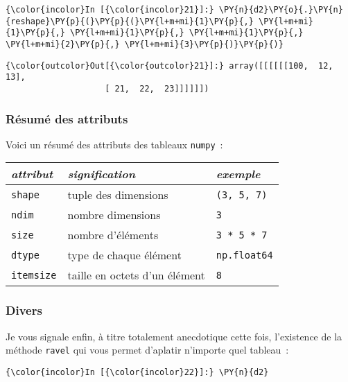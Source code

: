     \begin{Verbatim}[commandchars=\\\{\},frame=single,framerule=0.3mm,rulecolor=\color{cellframecolor}]
{\color{incolor}In [{\color{incolor}21}]:} \PY{n}{d2}\PY{o}{.}\PY{n}{reshape}\PY{p}{(}\PY{p}{(}\PY{l+m+mi}{1}\PY{p}{,} \PY{l+m+mi}{1}\PY{p}{,} \PY{l+m+mi}{1}\PY{p}{,} \PY{l+m+mi}{1}\PY{p}{,} \PY{l+m+mi}{2}\PY{p}{,} \PY{l+m+mi}{3}\PY{p}{)}\PY{p}{)}
\end{Verbatim}


\begin{Verbatim}[commandchars=\\\{\},frame=single,framerule=0.3mm,rulecolor=\color{cellframecolor}]
{\color{outcolor}Out[{\color{outcolor}21}]:} array([[[[[[100,  12,  13],
                    [ 21,  22,  23]]]]]])
\end{Verbatim}
            
    \hypertarget{ruxe9sumuxe9-des-attributs}{%
\subsubsection{Résumé des attributs}\label{ruxe9sumuxe9-des-attributs}}

    Voici un résumé des attributs des tableaux \texttt{numpy}~:

    \begin{longtable}[]{@{}lll@{}}
\toprule
\emph{attribut} & \emph{signification} & \emph{exemple}\tabularnewline
\midrule
\endhead
\texttt{shape} & tuple des dimensions &
\texttt{(3,\ 5,\ 7)}\tabularnewline
\texttt{ndim} & nombre dimensions & \texttt{3}\tabularnewline
\texttt{size} & nombre d'éléments &
\texttt{3\ *\ 5\ *\ 7}\tabularnewline
\texttt{dtype} & type de chaque élément &
\texttt{np.float64}\tabularnewline
\texttt{itemsize} & taille en octets d'un élément &
\texttt{8}\tabularnewline
\bottomrule
\end{longtable}

    \hypertarget{divers}{%
\subsubsection{Divers}\label{divers}}

    Je vous signale enfin, à titre totalement anecdotique cette fois,
l'existence de la méthode \texttt{ravel} qui vous permet d'aplatir
n'importe quel tableau~:

    \begin{Verbatim}[commandchars=\\\{\},frame=single,framerule=0.3mm,rulecolor=\color{cellframecolor}]
{\color{incolor}In [{\color{incolor}22}]:} \PY{n}{d2}
\end{Verbatim}



